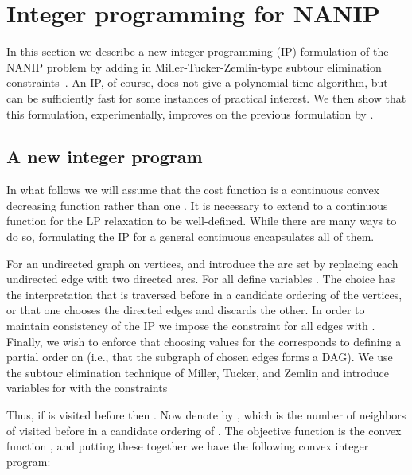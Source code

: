 \documentclass[english]{llncs}
\begin{document}
\section{Integer programming for NANIP}\label{section:IP}

In this section we describe a new integer programming (IP) formulation of the
NANIP problem by adding in Miller-Tucker-Zemlin-type subtour elimination
constraints~\cite{miller1960integer}.  An IP, of course, does not give a
polynomial time algorithm, but can be sufficiently fast for some instances of
practical interest.  We then show that this formulation, experimentally,
improves on the previous formulation by \cite{Gutfraind14}.

\subsection{A new integer program}

In what follows we will assume that the cost function  is a continuous
convex decreasing function  rather
than one . It is necessary to extend  to
a continuous function for the LP relaxation to be well-defined.  While there
are many ways to do so, formulating the IP for a general continuous 
encapsulates all of them.

For an undirected graph  on  vertices, and introduce the
arc set  by replacing each undirected edge with two directed arcs.  For all
 define variables .  The choice 
has the interpretation that  is traversed before  in a candidate ordering
of the vertices, or that one chooses the directed edges  and discards
the other. In order to maintain consistency of the IP we impose the constraint
 for all edges  with . Finally, we wish to
enforce that choosing values for the  corresponds to defining a partial
order on  (i.e., that the subgraph of chosen edges forms a DAG). We use the
subtour elimination technique of Miller, Tucker, and Zemlin
\cite{miller1960integer} and introduce variables  for 
with the constraints


\noindent Thus, if  is visited before  then .
Now denote by , which is the number of
neighbors of  visited before  in a candidate ordering of . The
objective function is the convex function , and putting these
together we have the following convex integer program: 

\begin{figure}[th]
\begin{centering}

\end{centering}
\end{figure}
\end{document}
